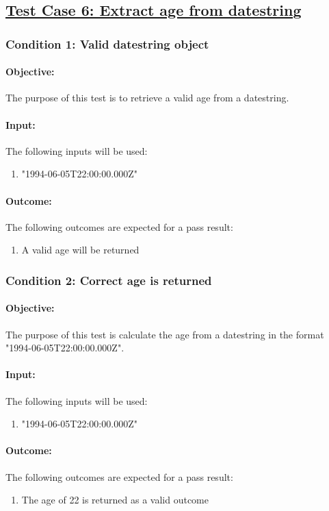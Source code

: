 \documentclass{article}
\begin{document}
\pagebreak

\subsection{\underline{Test Case 6: Extract age from datestring}}\label{test6}
\subsubsection{Condition 1: Valid datestring object }
\paragraph{Objective:} The purpose of this test is to retrieve a valid age from a datestring.
\paragraph{Input:} The following inputs will be used:
\begin{enumerate}
	\item "1994-06-05T22:00:00.000Z"
\end{enumerate}
\paragraph{Outcome:} The following outcomes are expected for a pass result:
\begin{enumerate}
	\item A valid age will be returned
\end{enumerate}
\subsubsection{Condition 2: Correct age is returned  }
\paragraph{Objective:}  The purpose of this test is calculate the age from a datestring in the format "1994-06-05T22:00:00.000Z".
\paragraph{Input:} The following inputs will be used:
\begin{enumerate}
	\item "1994-06-05T22:00:00.000Z"
\end{enumerate}
\paragraph{Outcome:} The following outcomes are expected for a pass result:
\begin{enumerate}
	\item The age of 22 is returned as a valid outcome
\end{enumerate}
\end{document}
